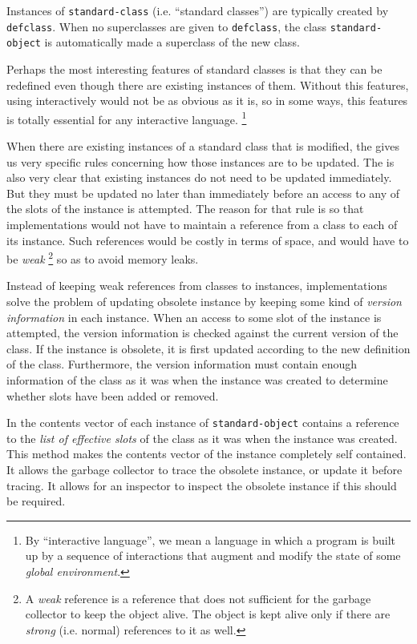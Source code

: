 Instances of \texttt{standard-class} (i.e. ``standard classes'') are
typically created by \texttt{defclass}.  When no superclasses are
given to \texttt{defclass}, the class \texttt{standard-object} is
automatically made a superclass of the new class.  

Perhaps the most interesting features of standard classes is that they
can be redefined even though there are existing instances of them.
Without this features, using \cl{} interactively would not be as
obvious as it is, so in some ways, this features is totally essential
for any interactive language.%
\footnote{By ``interactive language'', we mean a language in which a
  program is built up by a sequence of interactions that augment and
  modify the state of some \emph{global environment}.}

When there are existing instances of a standard class that is
modified, the \hs{} gives us very specific rules concerning how
those instances are to be updated.  The \hs{} is also very clear
that existing instances do not need to be updated immediately.  But
they must be updated no later than immediately before an access to any
of the slots of the instance is attempted.   The reason for that rule
is so that implementations would not have to maintain a reference from
a class to each of its instance.  Such references would be costly in
terms of space, and would have to be \emph{weak}%
\footnote{A \emph{weak} reference is a reference that does not
  sufficient for the garbage collector to keep the object alive.  The
  object is kept alive only if there are \emph{strong} (i.e. normal)
  references to it as well.}
so as to avoid memory leaks. 

Instead of keeping weak references from classes to instances,
implementations solve the problem of updating obsolete instance by
keeping some kind of \emph{version information} in each instance.
When an access to some slot of the instance is attempted, the version
information is checked against the current version of the class.  If
the instance is obsolete, it is first updated according to the new
definition of the class.  Furthermore, the version information must
contain enough information of the class as it was when the instance
was created to determine whether slots have been added or removed. 

In \sysname{} the contents vector of each instance of
\texttt{standard-object} contains a reference to the \emph{list of
  effective slots} of the class as it was when the instance was
created.  This method makes the contents vector of the instance
completely self contained.  It allows the garbage collector to trace
the obsolete instance, or update it before tracing.  It allows for an
inspector to inspect the obsolete instance if this should be
required.  


